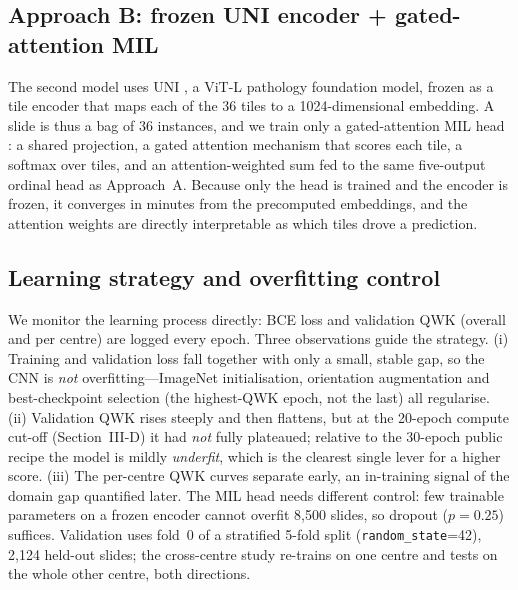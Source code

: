 \documentclass[conference]{IEEEtran}
\begin{document}
\subsection{Approach B: frozen UNI encoder + gated-attention MIL}
The second model uses UNI \cite{chen}, a ViT-L pathology foundation model, frozen
as a tile encoder that maps each of the 36 tiles to a 1024-dimensional embedding.
A slide is thus a bag of 36 instances, and we train only a gated-attention MIL head
\cite{ilse}: a shared projection, a gated attention mechanism that scores each
tile, a softmax over tiles, and an attention-weighted sum fed to the same
five-output ordinal head as Approach~A. Because only the head is trained and the
encoder is frozen, it converges in minutes from the precomputed embeddings, and the
attention weights are directly interpretable as which tiles drove a prediction.

\subsection{Learning strategy and overfitting control}
We monitor the learning process directly: BCE loss and validation QWK (overall and
per centre) are logged every epoch. Three observations guide the strategy. (i)
Training and validation loss fall together with only a small, stable gap, so the
CNN is \emph{not} overfitting---ImageNet initialisation, orientation augmentation
and best-checkpoint selection (the highest-QWK epoch, not the last) all regularise.
(ii) Validation QWK rises steeply and then flattens, but at the 20-epoch compute
cut-off (Section~III-D) it had \emph{not} fully plateaued; relative to the 30-epoch
public recipe the model is mildly \emph{underfit}, which is the clearest single
lever for a higher score. (iii) The per-centre QWK curves separate early, an
in-training signal of the domain gap quantified later. The MIL head needs different
control: few trainable parameters on a frozen encoder cannot overfit 8{,}500 slides,
so dropout ($p=0.25$) suffices. Validation uses fold~0 of a stratified 5-fold split
(\texttt{random\_state}=42), 2{,}124 held-out slides; the cross-centre study
re-trains on one centre and tests on the whole other centre, both directions.
\end{document}
